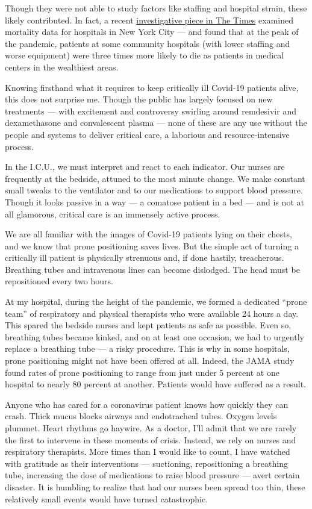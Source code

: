 Though they were not able to study factors like staffing and hospital
strain, these likely contributed. In fact, a recent
\href{https://www.nytimes3xbfgragh.onion/2020/07/01/nyregion/Coronavirus-hospitals.html}{investigative
piece in The Times} examined mortality data for hospitals in New York
City --- and found that at the peak of the pandemic, patients at some
community hospitals (with lower staffing and worse equipment) were three
times more likely to die as patients in medical centers in the
wealthiest areas.

Knowing firsthand what it requires to keep critically ill Covid-19
patients alive, this does not surprise me. Though the public has largely
focused on new treatments --- with excitement and controversy swirling
around remdesivir and dexamethasone and convalescent plasma --- none of
these are any use without the people and systems to deliver critical
care, a laborious and resource-intensive process.

In the I.C.U., we must interpret and react to each indicator. Our nurses
are frequently at the bedside, attuned to the most minute change. We
make constant small tweaks to the ventilator and to our medications to
support blood pressure. Though it looks passive in a way --- a comatose
patient in a bed --- and is not at all glamorous, critical care is an
immensely active process.

We are all familiar with the images of Covid-19 patients lying on their
chests, and we know that prone positioning saves lives. But the simple
act of turning a critically ill patient is physically strenuous and, if
done hastily, treacherous. Breathing tubes and intravenous lines can
become dislodged. The head must be repositioned every two hours.

At my hospital, during the height of the pandemic, we formed a dedicated
``prone team'' of respiratory and physical therapists who were available
24 hours a day. This spared the bedside nurses and kept patients as safe
as possible. Even so, breathing tubes became kinked, and on at least one
occasion, we had to urgently replace a breathing tube --- a risky
procedure. This is why in some hospitals, prone positioning might not
have been offered at all. Indeed, the JAMA study found rates of prone
positioning to range from just under 5 percent at one hospital to nearly
80 percent at another. Patients would have suffered as a result.

Anyone who has cared for a coronavirus patient knows how quickly they
can crash. Thick mucus blocks airways and endotracheal tubes. Oxygen
levels plummet. Heart rhythms go haywire. As a doctor, I'll admit that
we are rarely the first to intervene in these moments of crisis.
Instead, we rely on nurses and respiratory therapists. More times than I
would like to count, I have watched with gratitude as their
interventions --- suctioning, repositioning a breathing tube, increasing
the dose of medications to raise blood pressure --- avert certain
disaster. It is humbling to realize that had our nurses been spread too
thin, these relatively small events would have turned catastrophic.

